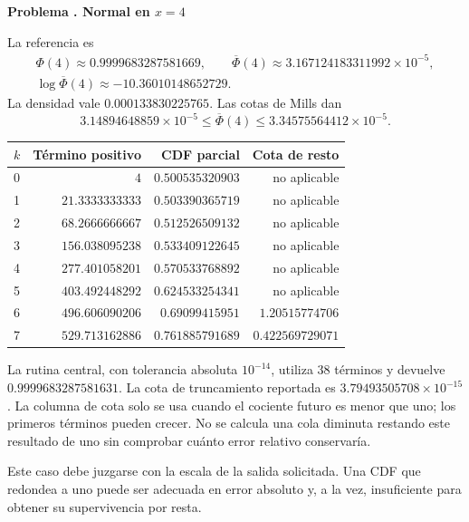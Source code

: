 \documentclass[11pt,a4paper]{article}
\theoremstyle{definition}
\newcommand{\Q}{\overline\Phi}
\newcounter{problema}
\newenvironment{resuelto}[1]{\refstepcounter{problema}\par\medskip\Needspace{6\baselineskip}\textbf{Problema \theproblema. #1}\par}{\par\medskip}
\begin{document}
\begin{resuelto}{Normal en $x=4$}
La referencia es
\[
\begin{gathered}
\Phi(4)\approx0.9999683287581669,\qquad \Q(4)\approx3.167124183311992\times10^{-5},\\
\log\Q(4)\approx-10.36010148652729.
\end{gathered}
\]
La densidad vale $0.000133830225765$. Las cotas de Mills dan
\[
3.14894648859\times10^{-5}\le\Q(4)\le3.34575564412\times10^{-5}.
\]

\begin{center}\small\begin{tabular}{lrrr}
\toprule
$k$ & Término positivo & CDF parcial & Cota de resto\\\midrule
0 & $4$ & $0.500535320903$ & no aplicable\\
1 & $21.3333333333$ & $0.503390365719$ & no aplicable\\
2 & $68.2666666667$ & $0.512526509132$ & no aplicable\\
3 & $156.038095238$ & $0.533409122645$ & no aplicable\\
4 & $277.401058201$ & $0.570533768892$ & no aplicable\\
5 & $403.492448292$ & $0.624533254341$ & no aplicable\\
6 & $496.606090206$ & $0.69099415951$ & $1.20515774706$\\
7 & $529.713162886$ & $0.761885791689$ & $0.422569729071$\\
\bottomrule\end{tabular}\end{center}

La rutina central, con tolerancia absoluta $10^{-14}$, utiliza 38 términos y devuelve $0.9999683287581631$. La cota de truncamiento reportada es $3.79493505708\times10^{-15}$. La columna de cota solo se usa cuando el cociente futuro es menor que uno; los primeros términos pueden crecer.
No se calcula una cola diminuta restando este resultado de uno sin comprobar cuánto error relativo conservaría.

Este caso debe juzgarse con la escala de la salida solicitada. Una CDF que redondea a uno puede ser adecuada en error absoluto y, a la vez, insuficiente para obtener su supervivencia por resta.
\end{resuelto}
\end{document}
